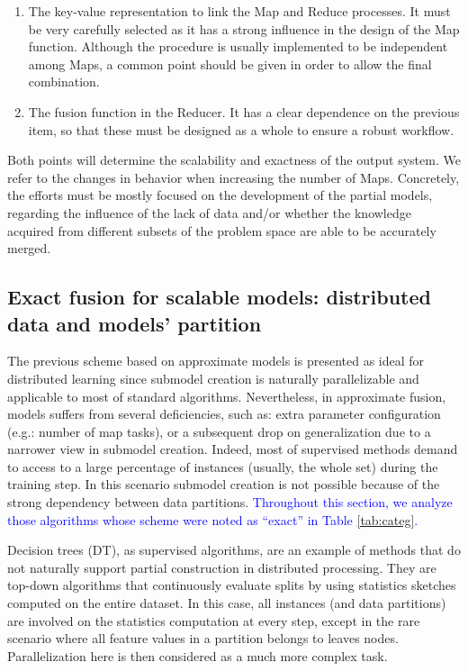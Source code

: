 \documentclass[3p,review]{elsarticle}
\begin{document}
	\begin{enumerate}
		\item The key-value representation to link the Map and Reduce processes. It must be very carefully selected as it has a strong influence in the design of the Map function. Although the procedure is usually implemented to be independent among Maps, a common point should be given in order to allow the final combination. 
		
		\item The fusion function in the Reducer. It has a clear dependence on the previous item, so that these must be designed as a whole to ensure a robust workflow.
		
	\end{enumerate}
	
	Both points will determine the scalability and exactness of the output system. We refer to the changes in behavior when increasing the number of Maps. Concretely, the efforts must be mostly focused on the development of the partial models, regarding the influence of the lack of data and/or whether the knowledge acquired from different subsets of the problem space are able to be accurately merged.
	
	\subsection{Exact fusion for scalable models: distributed data and models' partition}\label{subsec:exact}
	
	The previous scheme based on approximate models is presented as ideal for distributed learning since submodel creation is naturally parallelizable and applicable to most of standard algorithms. Nevertheless, in approximate fusion, models suffers from several deficiencies, such as: extra parameter configuration (e.g.: number of map tasks), or a subsequent drop on generalization due to a narrower view in submodel creation. Indeed, most of supervised methods demand to access to a large percentage of instances (usually, the whole set) during the training step. In this scenario submodel creation is not possible because of the strong dependency between data partitions. \textcolor{blue}{Throughout this section, we analyze those algorithms whose scheme were noted as ``exact'' in Table \ref{tab:categ}.}
	
	Decision trees (DT), as supervised algorithms, are an example of methods that do not naturally support partial construction in distributed processing. They are top-down algorithms that continuously evaluate splits by using statistics sketches computed on the entire dataset. In this case, all instances (and data partitions) are involved on the statistics computation at every step, except in the rare scenario where all feature values in a partition belongs to leaves nodes. Parallelization here is then considered as a much more complex task.
	
\end{document}

